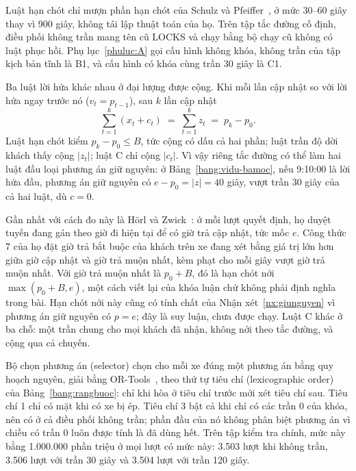 Luật hạn chót chỉ mượn phần hạn chót của Schulz và Pfeiffer~\cite{schulz2026}, ở mức 30--60 giây thay
vì 900 giây, không tái lập thuật toán của họ. Trên tập tắc đường cố định, điều phối không trần mang tên
cũ LOCKS và chạy bằng bộ chạy cũ không có luật phục hồi. Phụ lục~\ref{phuluc:A} gọi cấu hình không khóa,
không trần của tập kịch bản tĩnh là B1, và cấu hình có khóa cùng trần 30 giây là C1.

Ba luật lời hứa khác nhau ở đại lượng được cộng. Khi mỗi lần cập nhật so với lời hứa ngay trước nó
($v_t = p_{t-1}$), sau $k$ lần cập nhật
\begin{equation}
\sum_{t=1}^{k} (x_t + c_t) \;=\; \sum_{t=1}^{k} z_t \;=\; p_k - p_0 .
\label{eq:dongnhat}
\end{equation}
Luật hạn chót kiểm $p_k - p_0 \le B$, tức cộng có dấu cả hai phần; luật trần độ dời khách thấy cộng
$|z_t|$; luật C chỉ cộng $|c_t|$. Vì vậy riêng tắc đường có thể làm hai luật đầu loại phương án giữ
nguyên: ở Bảng~\ref{bang:vidu-bamoc}, nếu 9:10:00 là lời hứa đầu, phương án giữ nguyên có
$e - p_0 = |z| = 40$ giây, vượt trần 30 giây của cả hai luật, dù $c = 0$.

Gần nhất với cách đo này là Hörl và Zwick~\cite{horl2022}: ở mỗi lượt quyết định, họ duyệt tuyến đang
gán theo giờ đi hiện tại để có giờ trả cập nhật, tức mốc $e$. Công thức 7 của họ đặt giờ trả bắt buộc của
khách trên xe đang xét bằng giá trị lớn hơn giữa giờ cập nhật và giờ trả muộn nhất, kèm phạt cho mỗi giây
vượt giờ trả muộn nhất. Với giờ trả muộn nhất là $p_0 + B$, đó là hạn chót nới $\max(p_0 + B, e)$, một
cách viết lại của khóa luận chứ không phải định nghĩa trong bài. Hạn chót nới này cũng có tính chất của
Nhận xét~\ref{nx:giunguyen} vì phương án giữ nguyên có $p = e$; đây là suy luận, chưa được chạy. Luật C
khác ở ba chỗ: một trần chung cho mọi khách đã nhận, không nới theo tắc đường, và cộng qua cả chuyến.

Bộ chọn phương án (selector) chọn cho mỗi xe đúng một phương án bằng quy hoạch nguyên, giải bằng
OR-Tools~\cite{ortools}, theo thứ tự tiêu chí (lexicographic order) của Bảng~\ref{bang:rangbuoc}: chỉ khi
hòa ở tiêu chí trước mới xét tiêu chí sau. Tiêu chí 1 chỉ có mặt khi có xe bị ép. Tiêu chí 3 bật cả khi
chỉ có các trần 0 của khóa, nên có ở cả điều phối không trần; phần đầu của nó không phân biệt phương án
vì chiều có trần 0 luôn được tính là đã dùng hết. Trên tập kiểm tra chính, mức này bằng 1.000.000 phần
triệu ở mọi lượt có mức này: 3.503 lượt khi không trần, 3.506 lượt với trần 30 giây và 3.504 lượt với
trần 120 giây.

